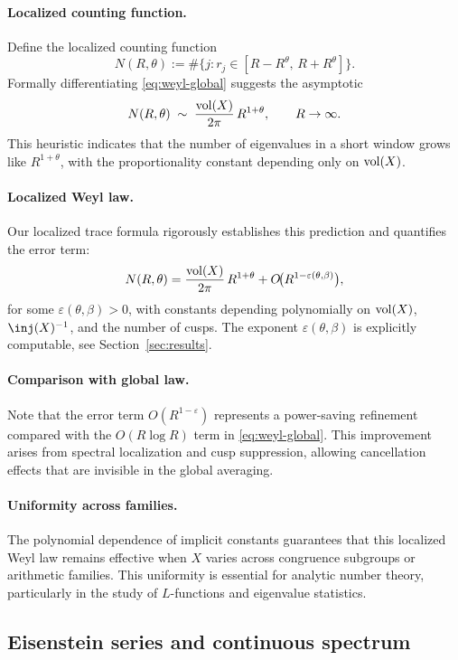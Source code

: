 \paragraph{Localized counting function.}
Define the localized counting function
\[
  N(R,\theta) := \#\{ j : r_j \in [R-R^\theta,\, R+R^\theta]\}.
\]
Formally differentiating \eqref{eq:weyl-global} suggests the asymptotic
\[
  N(R,\theta) \;\sim\; \frac{\operatorname{vol}(X)}{2\pi}\,R^{1+\theta}, \qquad R\to\infty.
\]
This heuristic indicates that the number of eigenvalues in a short window 
grows like $R^{1+\theta}$, with the proportionality constant depending only on $\operatorname{vol}(X)$.  

\paragraph{Localized Weyl law.}
Our localized trace formula rigorously establishes this prediction and quantifies the error term:
\[
  N(R,\theta) = \frac{\operatorname{vol}(X)}{2\pi}\, R^{1+\theta} + O\!\big(R^{1-\varepsilon(\theta,\beta)}\big),
\]
for some $\varepsilon(\theta,\beta)>0$, with constants depending polynomially on $\operatorname{vol}(X)$, $\inj(X)^{-1}$, and the number of cusps.  
The exponent $\varepsilon(\theta,\beta)$ is explicitly computable, see Section~\ref{sec:results}.

\paragraph{Comparison with global law.}
Note that the error term $O(R^{1-\varepsilon})$ represents a power-saving refinement compared with 
the $O(R\log R)$ term in \eqref{eq:weyl-global}.  
This improvement arises from spectral localization and cusp suppression, 
allowing cancellation effects that are invisible in the global averaging.

\paragraph{Uniformity across families.}
The polynomial dependence of implicit constants guarantees that this localized Weyl law 
remains effective when $X$ varies across congruence subgroups or arithmetic families.  
This uniformity is essential for analytic number theory, particularly in the study of 
$L$-functions and eigenvalue statistics.

\subsection{Eisenstein series and continuous spectrum}\label{subsec:eisenstein}

